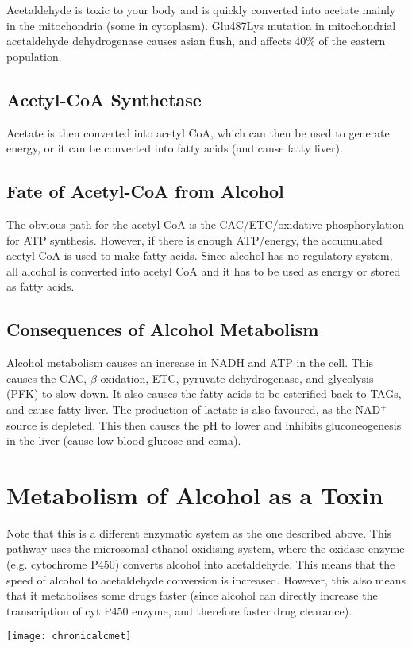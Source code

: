 Acetaldehyde is toxic to your body and is quickly converted into acetate mainly in the mitochondria (some in cytoplasm).
Glu487Lys mutation in mitochondrial acetaldehyde dehydrogenase causes asian flush, and affects 40\% of the eastern population.

\subsection{Acetyl-CoA Synthetase}

\begin{center}
\end{center}

Acetate is then converted into acetyl CoA, which can then be used to generate energy, or it can be converted into fatty acids (and cause fatty liver).

\subsection{Fate of Acetyl-CoA from Alcohol}

The obvious path for the acetyl CoA is the CAC/ETC/oxidative phosphorylation for ATP synthesis.
However, if there is enough ATP/energy, the accumulated acetyl CoA is used to make fatty acids.
Since alcohol has no regulatory system, all alcohol is converted into acetyl CoA and it has to be used as energy or stored as fatty acids.

\subsection{Consequences of Alcohol Metabolism}

Alcohol metabolism causes an increase in NADH and ATP in the cell.
This causes the CAC, $\beta$-oxidation, ETC, pyruvate dehydrogenase, and glycolysis (PFK) to slow down.
It also causes the fatty acids to be esterified back to TAGs, and cause fatty liver.
The production of lactate is also favoured, as the NAD$^+$ source is depleted.
This then causes the pH to lower and inhibits gluconeogenesis in the liver (cause low blood glucose and coma).

\section{Metabolism of Alcohol as a Toxin}

Note that this is a different enzymatic system as the one described above.
This pathway uses the microsomal ethanol oxidising system, where the oxidase enzyme (e.g. cytochrome P450) converts alcohol into acetaldehyde.
This means that the speed of alcohol to acetaldehyde conversion is increased.
However, this also means that it metabolises some drugs faster (since alcohol can directly increase the transcription of cyt P450 enzyme, and therefore faster drug clearance).

\begin{center}
\texttt{[image: chronicalcmet]}
\end{center}

